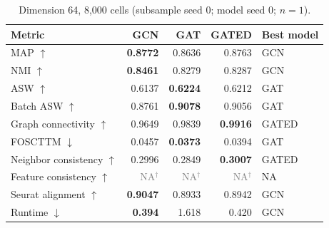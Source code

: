 \documentclass[10pt]{article}
\begin{document}
\begin{table}[H]\centering\small
\caption{Dimension 64, 8,000 cells (subsample seed 0; model seed 0; $n=1$).}
\begin{tabular}{@{}lrrrl@{}}\toprule
Metric & GCN & GAT & GATED & Best model \\\midrule
MAP $\uparrow$ & \textbf{0.8772} & 0.8636 & 0.8763 & GCN \\
NMI $\uparrow$ & \textbf{0.8461} & 0.8279 & 0.8287 & GCN \\
ASW $\uparrow$ & 0.6137 & \textbf{0.6224} & 0.6212 & GAT \\
Batch ASW $\uparrow$ & 0.8761 & \textbf{0.9078} & 0.9056 & GAT \\
Graph connectivity $\uparrow$ & 0.9649 & 0.9839 & \textbf{0.9916} & GATED \\
FOSCTTM $\downarrow$ & 0.0457 & \textbf{0.0373} & 0.0394 & GAT \\
Neighbor consistency $\uparrow$ & 0.2996 & 0.2849 & \textbf{0.3007} & GATED \\
Feature consistency $\uparrow$ & \textcolor{gray}{NA$^{\dagger}$} & \textcolor{gray}{NA$^{\dagger}$} & \textcolor{gray}{NA$^{\dagger}$} & NA \\
Seurat alignment $\uparrow$ & \textbf{0.9047} & 0.8933 & 0.8942 & GCN \\
Runtime $\downarrow$ & \textbf{0.394} & 1.618 & 0.420 & GCN \\
\bottomrule\end{tabular}
\end{table}
\end{document}
